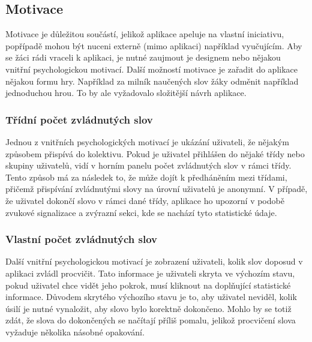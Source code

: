 \documentclass[a4paper,11pt,titlepage,fleqn]{article}
\begin{document}
    \subsection{Motivace}
        Motivace je důležitou součástí, jelikož aplikace apeluje na vlastní iniciativu, popřípadě mohou být nuceni externě (mimo aplikaci) například vyučujícím. Aby se žáci rádi vraceli k aplikaci, je nutné zaujmout je designem nebo nějakou vnitřní psychologickou motivací. Další možností motivace je zařadit do aplikace nějakou formu hry. Například za milník naučených slov žáky odměnit například jednoduchou hrou. To by ale vyžadovalo složitější návrh aplikace.

        \subsubsection{Třídní počet zvládnutých slov}
            Jednou z vnitřních psychologických motivací je ukázání uživateli, že nějakým způsobem přispívá do kolektivu. Pokud je uživatel přihlášen do nějaké třídy nebo skupiny uživatelů, vidí v horním panelu počet zvládnutých slov v rámci třídy. Tento způsob má za následek to, že může dojít k předháněním mezi třídami, přičemž přispívání zvládnutými slovy na úrovní uživatelů je anonymní. V případě, že uživatel dokončí slovo v rámci dané třídy, aplikace ho upozorní v podobě zvukové signalizace a zvýrazní sekci, kde se nachází tyto statistické údaje.

        \subsubsection{Vlastní počet zvládnutých slov}
            Další vnitřní psychologickou motivací je zobrazení uživateli, kolik slov doposud v aplikaci zvládl procvičit. Tato informace je uživateli skryta ve výchozím stavu, pokud uživatel chce vidět jeho pokrok, musí kliknout na doplňující statistické informace. Důvodem skrytého výchozího stavu je to, aby uživatel neviděl, kolik úsilí je nutné vynaložit, aby slovo bylo korektně dokončeno. Mohlo by se totiž zdát, že slova do dokončených se načítají příliš pomalu, jelikož procvičení slova vyžaduje několika násobné opakování. 
\end{document}
